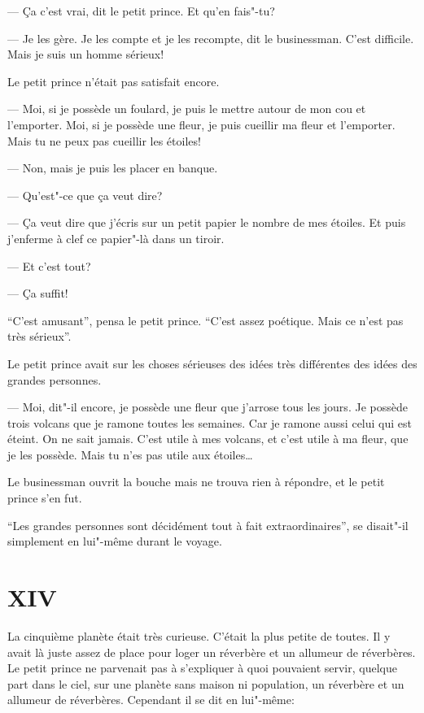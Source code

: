 \begin{Parallel}[p]{}{}
{--- Ça c'est vrai, dit le petit prince. Et qu'en fais"-tu?

--- Je les gère. Je les compte et je les recompte, dit
le businessman. C'est difficile. Mais je suis un homme sérieux!

Le petit prince n'était pas satisfait encore.

--- Moi, si je possède un foulard, je puis le mettre
autour de mon cou et l'emporter. Moi, si je possède
une fleur, je puis cueillir ma fleur et l'emporter.
Mais tu ne peux pas cueillir les étoiles!

--- Non, mais je puis les placer en banque.

--- Qu'est"-ce que ça veut dire?

--- Ça veut dire que j'écris sur un petit papier le
nombre de mes étoiles. Et puis j'enferme à clef ce
papier"-là dans un tiroir.

--- Et c'est tout?

--- Ça suffit!

``C'est amusant'', pensa le petit prince. ``C'est assez
poétique. Mais ce n'est pas très sérieux''.

Le petit prince avait sur les choses sérieuses des idées très différentes des idées des grandes personnes.

--- Moi, dit"-il encore, je possède une fleur que j'arrose tous les jours. Je possède trois volcans que je
ramone toutes les semaines. Car je ramone aussi
celui qui est éteint. On ne sait jamais. C'est utile à
mes volcans, et c'est utile à ma fleur, que je les possède. Mais tu n'es pas utile aux étoiles\ldots{}

Le businessman ouvrit la bouche mais ne trouva
rien à répondre, et le petit prince s'en fut.

``Les grandes personnes sont décidément tout à
fait extraordinaires'', se disait"-il simplement en lui"-même durant le voyage.

\section{XIV}

La cinquième planète était très curieuse. C'était la
plus petite de toutes. Il y avait là juste assez de place
pour loger un réverbère et un allumeur de réverbères. Le petit prince ne parvenait pas à s'expliquer à
quoi pouvaient servir, quelque part dans le ciel,
sur une planète sans maison ni population, un
réverbère et un allumeur de réverbères. Cependant
il se dit en lui"-même:

}
\end{Parallel}
